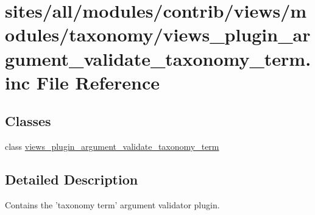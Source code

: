 \hypertarget{views__plugin__argument__validate__taxonomy__term_8inc}{
\section{sites/all/modules/contrib/views/modules/taxonomy/views\_\-plugin\_\-argument\_\-validate\_\-taxonomy\_\-term.inc File Reference}
\label{views__plugin__argument__validate__taxonomy__term_8inc}
}
\subsection*{Classes}
\begin{CompactItemize}
\item 
class \hyperlink{classviews__plugin__argument__validate__taxonomy__term}{views\_\-plugin\_\-argument\_\-validate\_\-taxonomy\_\-term}
\end{CompactItemize}


\subsection{Detailed Description}
Contains the 'taxonomy term' argument validator plugin. 